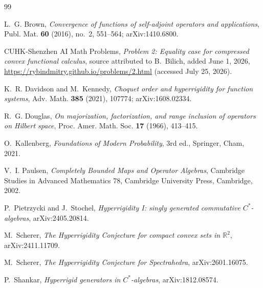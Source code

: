 \documentclass[11pt,a4paper]{amsart}
\theoremstyle{remark}
\begin{document}
\begin{thebibliography}{99}

L.~G. Brown,
\emph{Convergence of functions of self-adjoint operators and applications},
Publ. Mat. \textbf{60} (2016), no.~2, 551--564;
arXiv:1410.6800.

CUHK-Shenzhen AI Math Problems,
\emph{Problem 2: Equality case for compressed convex functional calculus},
source attributed to B.~Bilich, added June 1, 2026,
\url{https://rybindmitry.github.io/problems/2.html}
(accessed July 25, 2026).

K.~R. Davidson and M.~Kennedy,
\emph{Choquet order and hyperrigidity for function systems},
Adv. Math. \textbf{385} (2021), 107774;
arXiv:1608.02334.

R.~G. Douglas,
\emph{On majorization, factorization, and range inclusion of operators on
Hilbert space},
Proc. Amer. Math. Soc. \textbf{17} (1966), 413--415.

O.~Kallenberg,
\emph{Foundations of Modern Probability},
3rd ed., Springer, Cham, 2021.

V.~I. Paulsen,
\emph{Completely Bounded Maps and Operator Algebras},
Cambridge Studies in Advanced Mathematics 78,
Cambridge University Press, Cambridge, 2002.

P.~Pietrzycki and J.~Stochel,
\emph{Hyperrigidity I: singly generated commutative \(C^*\)-algebras},
arXiv:2405.20814.

M.~Scherer,
\emph{The Hyperrigidity Conjecture for compact convex sets in
\(\mathbb R^2\)},
arXiv:2411.11709.

M.~Scherer,
\emph{The Hyperrigidity Conjecture for Spectrahedra},
arXiv:2601.16075.

P.~Shankar,
\emph{Hyperrigid generators in \(C^*\)-algebras},
arXiv:1812.08574.

\end{thebibliography}
\end{document}
